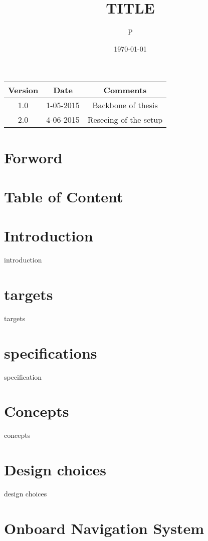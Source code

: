 \documentclass[parskip=full,11pt,a4paper,titlepage]{article}
\title{TITLE}
\author{P}
\date{\today}
\begin{document}



\clearpage

\begin{center}
\begin{tabular}{|c|c|c|}
\hline
	Version	& Date & Comments \\
\hline
	1.0		& 1-05-2015	 & Backbone of thesis \\
	2.0		& 4-06-2015	 & Reseeing of the setup\\
\hline
\end{tabular}
\end{center}
\clearpage


\tableofcontents
\clearpage
\section{Forword}

\section{Table of Content}

\section{Introduction}
{introduction}
\clearpage

\section{targets}
{targets}
\clearpage

\section{specifications}
{specification}
\clearpage
\section{Concepts}
{concepts}
\clearpage

\section{Design choices}
{design choices}
\clearpage

\section{Onboard Navigation System}
\end{document}
